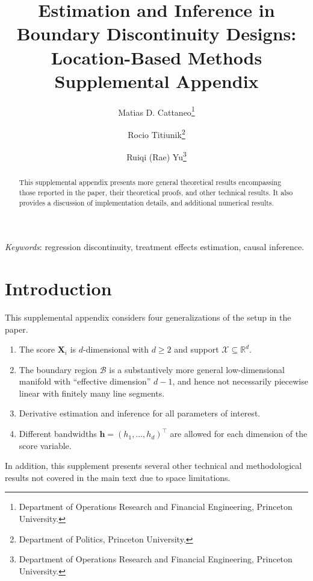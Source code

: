 \documentclass[10pt]{article}
\newcommand{\bh}{\mathbf{h}}
\newcommand{\bX}{\mathbf{X}}
\newcommand{\B}{\mathcal{B}}
\begin{document}
\title{Estimation and Inference in Boundary Discontinuity Designs: Location-Based Methods\\ Supplemental Appendix\bigskip}
\author{Matias D. Cattaneo\thanks{Department of Operations Research and Financial Engineering, Princeton University.} \and
	    Rocio Titiunik\thanks{Department of Politics, Princeton University.} \and
	    Ruiqi (Rae) Yu\thanks{Department of Operations Research and Financial Engineering, Princeton University.}
	    }
\maketitle


\begin{abstract}
    This supplemental appendix presents more general theoretical results encompassing those reported in the paper, their theoretical proofs, and other technical results. It also provides a discussion of implementation details, and additional numerical results.
\end{abstract}

\textit{Keywords}: regression discontinuity, treatment effects estimation, causal inference.


\thispagestyle{empty}
\clearpage

\onehalfspacing
\setcounter{page}{1}
\pagestyle{plain}

\setcounter{tocdepth}{2}
\setcounter{secnumdepth}{4}
\tableofcontents

\clearpage


\section{Introduction}

This supplemental appendix considers four generalizations of the setup in the paper.
\begin{enumerate}
    \item The score $\bX_i$ is $d$-dimensional with $d\geq2$ and support $\mathcal{X}\subseteq\mathbb{R}^d$.
    \item The boundary region $\B$ is a substantively more general low-dimensional manifold with ``effective dimension'' $d-1$, and hence not necessarily piecewise linear with finitely many line segments.
    \item Derivative estimation and inference for all parameters of interest.
    \item Different bandwidths $\bh = (h_1, \ldots, h_d)^{\top}$ are allowed for each dimension of the score variable.
\end{enumerate}
In addition, this supplement presents several other technical and methodological results not covered in the main text due to space limitations.
\end{document}
